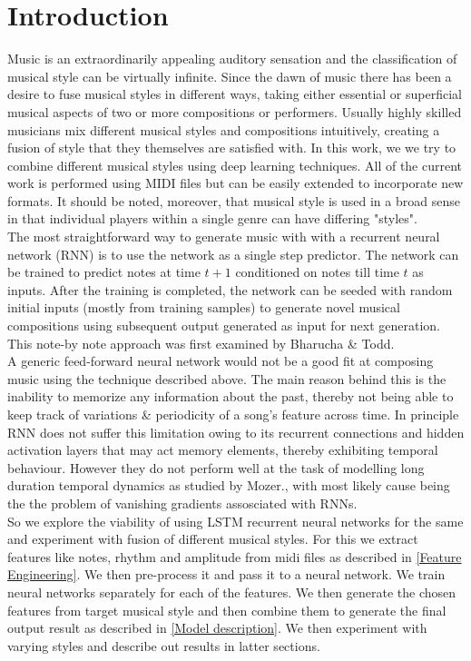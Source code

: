 \documentclass[conference]{IEEEtran}
\begin{document}
\section{Introduction}
Music is an extraordinarily appealing auditory sensation and the classification of musical style can be virtually infinite. Since the dawn of music there has been a desire to fuse musical styles in different ways, taking either essential or superficial musical aspects of two or more compositions or performers. Usually highly skilled musicians mix different musical styles and compositions intuitively, creating a fusion of style that they themselves are satisfied with. In this work, we we try to combine different musical styles using deep learning techniques. All of the current work is performed using MIDI files but can be easily extended to incorporate new formats. It should be noted, moreover, that musical style is used in a broad sense in that individual players within a single genre can have differing "styles".\\

The most straightforward way to generate music with with a recurrent neural network (RNN) is to use the network as a single step predictor. The network can be trained to predict notes at time $t+1$ conditioned on notes till time $t$ as inputs. After the training is completed, the network can be seeded with random initial inputs (mostly from training samples) to generate novel musical compositions using subsequent output generated as input for next generation. This note-by note approach was first examined by Bharucha \& Todd.\cite{todd,eck}\\

A generic feed-forward neural network would not be a good fit at composing music using the technique described above. The main reason behind this is the inability to memorize any information about the past, thereby not being able to keep track of variations \& periodicity of a song's  feature across time. In principle RNN does not suffer this limitation owing to its recurrent connections and hidden activation layers that may act memory elements, thereby exhibiting temporal behaviour. However they do not perform well at the task of modelling long duration temporal dynamics as studied by Mozer.\cite{mozer}, with most likely cause being the the problem of vanishing gradients assosciated with RNNs.\cite{hochreiter}\\

So we explore the viability of using LSTM recurrent neural networks for the same and experiment with fusion of different musical styles. For this we extract features like notes, rhythm and amplitude from midi files as described in \ref{Feature Engineering}. We then pre-process it and pass it to a neural network. We train neural networks separately for each of the features. We then generate the chosen features from target musical style and then combine them to generate the final output result as described in \ref{Model description}. We then experiment with varying styles and describe out results in latter sections.
\end{document}
